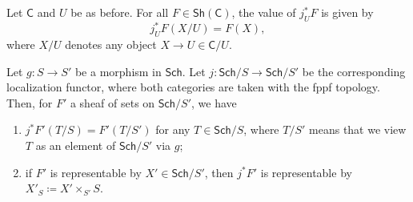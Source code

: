 \begin{rem}
	Let $\mathsf{C}$ and $U$ be as before.
	For all $F \in \mathsf{Sh}\left(\mathsf{C}\right)$, the value of $j_U^*F$
	is given by
	\begin{equation*}
		j_U^*F(X/U) = F(X)
	,\end{equation*}
	where $X/U$ denotes any object $X \to U \in \mathsf{C}/U$.
\end{rem}


\begin{lem}
	Let $g\colon S \to S'$ be a morphism in $\mathsf{Sch}$.
	Let $j\colon \mathsf{Sch}/S \to \mathsf{Sch}/S'$ be the corresponding
	localization functor, where both categories are taken with the fppf topology.
	Then, for $F'$ a sheaf of sets on $\mathsf{Sch}/S'$, we have
\begin{enumerate}
	\item $j^* F'(T/S) = F'(T/S')$ for any $T \in \mathsf{Sch}/S$,
		where $T/S'$ means that we view $T$ as an element of $\mathsf{Sch}/S'$
		via $g$;
	\item if $F'$ is representable by $X' \in \mathsf{Sch}/S'$,
		then $j^*F'$ is representable by $X'_S \coloneqq X' \times_{ S' } S$.
\end{enumerate}
\end{lem} 
